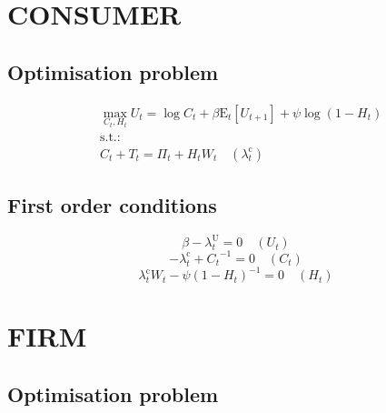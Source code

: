 

\section{CONSUMER}

\subsection{Optimisation problem}

\begin{align}
&\max_{C_{t}, H_{t}
} U_{t} = \log{C_{t}} + {\beta} {\mathrm{E}_{t}\left[U_{t+1}\right]} + {\psi} {\log\left(1 - H_{t}\right)}\\
&\mathrm{s.t.:}\nonumber\\
& C_{t} + T_{t} = \Pi_{t} + {H_{t}} {W_{t}} \quad \left(\lambda^{\mathrm{c}}_{t}\right)
\end{align}


\subsection{First order conditions}

\begin{equation}
\beta - \lambda^{\mathrm{U}}_{t} = 0
 \quad \left(U_{t}\right)
\end{equation}
\begin{equation}
-\lambda^{\mathrm{c}}_{t} + {C_{t}}^{-1} = 0
 \quad \left(C_{t}\right)
\end{equation}
\begin{equation}
{\lambda^{\mathrm{c}}_{t}} {W_{t}} - {\psi} \left(1 - H_{t}\right)^{-1} = 0
 \quad \left(H_{t}\right)
\end{equation}




\section{FIRM}

\subsection{Optimisation problem}

